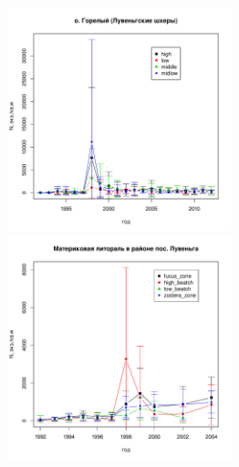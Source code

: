 \documentclass[12pt, a4paper]{article}
\begin{document}
\newpage
\begin{figure}[h]

\begin{minipage}[b]{.46\linewidth}
\begin{center}
	\includegraphics[width=65mm]{../White_Sea/Luvenga_Goreliy/N_dynamic.pdf}
\end{center}
\end{minipage}
%
\hfil %
%
\begin{minipage}[b]{.46\linewidth}
\begin{center}
	\includegraphics[width=65mm]{../White_Sea//Luvenga_II_razrez/N_dynamic.pdf}
\end{center}
\end{minipage}





\end{figure}
\end{document}
